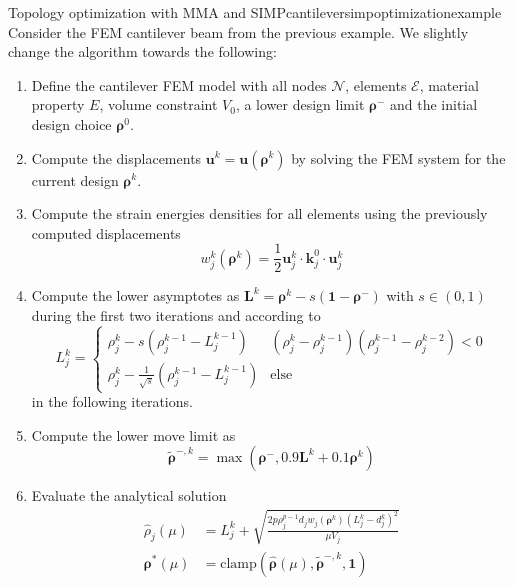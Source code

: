 \begin{example}{Topology optimization with MMA and SIMP}{cantileversimpoptimizationexample}
    Consider the FEM cantilever beam from the previous example. We slightly change the algorithm towards the following:  
    \begin{enumerate}
        \item Define the cantilever FEM model with all nodes $\mathcal{N}$, elements $\mathcal{E}$, material property $E$, volume constraint $V_0$, a lower design limit $\pmb{\rho}^-$ and the initial design choice $\pmb{\rho}^0$.
        \item Compute the displacements $\mathbf{u}^k = \mathbf{u}(\pmb{\rho}^k)$ by solving the FEM system for the current design $\pmb{\rho}^k$.
        \item Compute the strain energies densities for all elements using the previously computed displacements   
        \begin{equation}
            w^k_j(\pmb{\rho}^k) = \frac{1}{2}\mathbf{u}^k_j \cdot \mathbf{k}^0_j \cdot \mathbf{u}^k_j
        \end{equation}
        \item Compute the lower asymptotes as $\mathbf{L}^k =\pmb{\rho}^k - s (\mathbf{1} - \pmb{\rho}^-)$ with $s \in (0,1)$ during the first two iterations and according to 
        \begin{equation}
            L^k_j = 
            \begin{cases}
                \rho^k_j - s  (\rho^{k-1}_j-L^{k-1}_j) & (\rho_j^k-\rho_j^{k-1})(\rho_j^{k-1}-\rho_j^{k-2}) < 0\\
                \rho^k_j - \frac{1}{\sqrt{s}}  (\rho^{k-1}_j-L^{k-1}_j) & \text{else}
            \end{cases}
        \end{equation}
        in the following iterations.
        \item Compute the lower move limit as 
        \begin{equation}
            \tilde{\pmb{\rho}}^{-,k} = \max(\pmb{\rho}^-,  0.9 \mathbf{L}^k + 0.1 \pmb{\rho}^k)
        \end{equation}
        \item Evaluate the analytical solution
            \begin{align}
                \hat{\rho}_j(\mu) &= L_j^k + \sqrt{\frac{2 p \rho_j^{p-1} d_j w_j (\pmb{\rho}^k)
                (L^k_j-d^k_j)^2}{\mu V_j}} \\
                \pmb{\rho}^* (\mu) &= \textrm{clamp}\left(\hat{\pmb{\rho}}(\mu), \tilde{\pmb{\rho}}^{-,k}, \mathbf{1}\right)

\end{align}
\end{enumerate}
\end{example}

